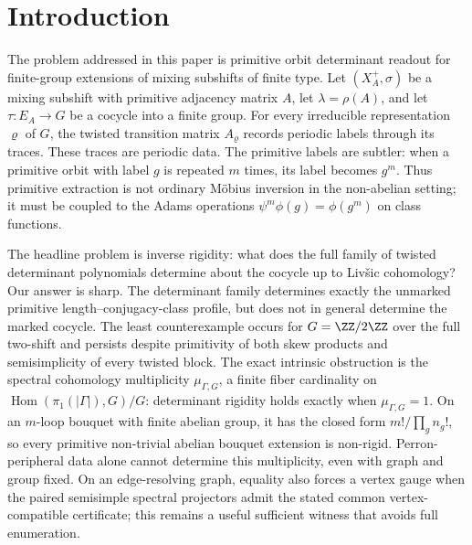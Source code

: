 \section{Introduction}\label{sec:introduction}

The problem addressed in this paper is primitive orbit determinant readout
for finite-group extensions of mixing subshifts of finite type. Let
\((X_A^+,\sigma)\) be a mixing subshift with primitive adjacency matrix
\(A\), let \(\lambda=\rho(A)\), and let \(\tau:E_A\to G\) be a cocycle
into a finite group. For every irreducible representation \(\varrho\)
of \(G\), the twisted transition matrix \(A_\varrho\) records periodic
labels through its traces. These traces are periodic data. The
primitive labels are subtler: when a primitive orbit with label \(g\)
is repeated \(m\) times, its label becomes \(g^m\). Thus primitive
extraction is not ordinary M\"obius inversion in the non-abelian
setting; it must be coupled to the Adams operations
\(\psi^m\phi(g)=\phi(g^m)\) on class functions.

The headline problem is inverse rigidity: what does the full family of
twisted determinant polynomials determine about the cocycle up to
Liv\v{s}ic cohomology?  Our answer is sharp.  The determinant family
determines exactly the unmarked primitive length--conjugacy-class profile,
but does not in general determine the marked cocycle.  The least
counterexample occurs for \(G=\ZZ/2\ZZ\) over the full two-shift and persists
despite primitivity of both skew products and semisimplicity of every twisted
block.  The exact intrinsic obstruction is the spectral cohomology
multiplicity \(\mu_{\Gamma,G}\), a finite fiber cardinality on
\(\operatorname{Hom}(\pi_1(|\Gamma|),G)/G\): determinant rigidity holds
exactly when \(\mu_{\Gamma,G}=1\).  On an \(m\)-loop bouquet with finite
abelian group, it has the closed form \(m!/\prod_g n_g!\), so every primitive
non-trivial abelian bouquet extension is non-rigid.  Perron-peripheral data
alone cannot determine this multiplicity, even with graph and group fixed.
On an edge-resolving graph, equality also forces a vertex gauge when the
paired semisimple spectral projectors admit the stated common
vertex-compatible certificate; this remains a useful sufficient witness
that avoids full enumeration.

